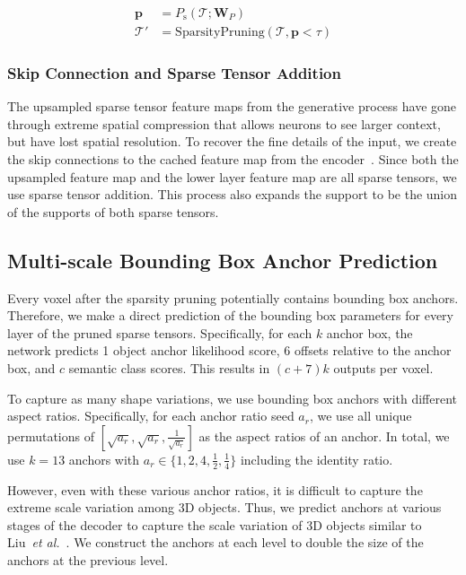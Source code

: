 \documentclass[runningheads]{llncs}
\newcommand{\etal}{\textit{et al.}}
\begin{document}
\begin{align}
\mathbf{p} & = P_{\text{s}}(\mathscr{T}; \mathbf{W}_P) \\
\mathscr{T}' & = \text{SparsityPruning}(\mathscr{T}, \mathbf{p} < \tau)
\end{align}

\subsubsection{Skip Connection and Sparse Tensor Addition}
\label{sec:sparse_tensor_addition}

The upsampled sparse tensor feature maps from the generative process have gone through extreme spatial compression that allows neurons to see larger context, but have lost spatial resolution. To recover the fine details of the input, we create the skip connections to the cached feature map from the encoder~\cite{minkowskinet,FCGF2019}. Since both the upsampled feature map and the lower layer feature map are all sparse tensors, we use sparse tensor addition. This process also expands the support to be the union of the supports of both sparse tensors.

\subsection{Multi-scale Bounding Box Anchor Prediction}
\label{sec:bbox_prediction}

Every voxel after the sparsity pruning potentially contains bounding box anchors. Therefore, we make a direct prediction of the bounding box parameters for every layer of the pruned sparse tensors. Specifically, for each $k$ anchor box, the network predicts 1 object anchor likelihood score, 6 offsets relative to the anchor box, and $c$ semantic class scores. This results in $(c+7)k$ outputs per voxel.

To capture as many shape variations, we use bounding box anchors with different aspect ratios. Specifically, for each anchor ratio seed $a_r$, we use all unique permutations of $\left[\sqrt{a_r}, \sqrt{a_r}, \frac{1}{\sqrt{a_r}}\right]$ as the aspect ratios of an anchor. In total, we use $k=13$ anchors with $a_r \in \{1, 2, 4, \frac{1}{2}, \frac{1}{4}\}$ including the identity ratio.

However, even with these various anchor ratios, it is difficult to capture the extreme scale variation among 3D objects. Thus, we predict anchors at various stages of the decoder to capture the scale variation of 3D objects similar to Liu~\etal~\cite{liu2016ssd}. We construct the anchors at each level to double the size of the anchors at the previous level.
\end{document}
